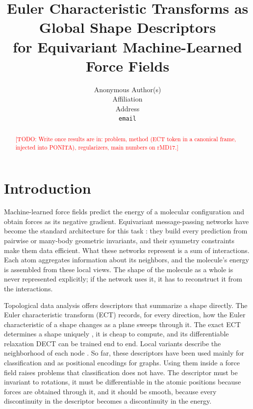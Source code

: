 \documentclass{article}
\title{Euler Characteristic Transforms as Global Shape Descriptors\\for Equivariant Machine-Learned Force Fields}
\author{Anonymous Author(s)\\Affiliation\\Address\\\texttt{email}}
\newcommand{\todo}[1]{\textcolor{red}{[TODO: #1]}}
\begin{document}
\maketitle

\begin{abstract}
\todo{Write once results are in: problem, method (ECT token in a canonical frame, injected into PONITA), regularizers, main numbers on rMD17.}
\end{abstract}

\section{Introduction}
\label{sec:intro}
Machine-learned force fields predict the energy of a molecular configuration and obtain forces as its negative gradient. Equivariant message-passing networks have become the standard architecture for this task \citep{batzner2022nequip,batatia2022mace,bekkers2024ponita}: they build every prediction from pairwise or many-body geometric invariants, and their symmetry constraints make them data efficient. What these networks represent is a sum of interactions. Each atom aggregates information about its neighbors, and the molecule's energy is assembled from these local views. The shape of the molecule as a whole is never represented explicitly; if the network uses it, it has to reconstruct it from the interactions.

Topological data analysis offers descriptors that summarize a shape directly. The Euler characteristic transform (ECT) \citep{turner2014pht} records, for every direction, how the Euler characteristic of a shape changes as a plane sweeps through it. The exact ECT determines a shape uniquely \citep{turner2014pht,ghrist2018euler,curry2022directions}, it is cheap to compute, and its differentiable relaxation DECT \citep{roell2024dect} can be trained end to end. Local variants describe the neighborhood of each node \citep{vonrohrscheidt2025disslect,garciaamboage2026leap}. So far, these descriptors have been used mainly for classification and as positional encodings for graphs. Using them inside a force field raises problems that classification does not have. The descriptor must be invariant to rotations, it must be differentiable in the atomic positions because forces are obtained through it, and it should be smooth, because every discontinuity in the descriptor becomes a discontinuity in the energy.
\end{document}
